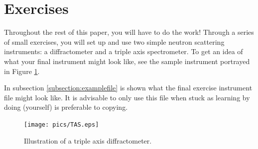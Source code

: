 \section{Exercises}
Throughout the rest of this paper, you will have to do the work!
Through a series of small exercises, you will set up and use two simple
neutron scattering instruments: a diffractometer and a triple axis spectrometer. To get an idea of what your final
instrument might look like, see the sample instrument portrayed in Figure \ref{instr.eps}.

In subsection \ref{subsection:examplefile} is shown what the final exercise instrument file might look like. It is advisable to only use this file when stuck as learning by doing (yourself) is preferable to copying.
\begin{figure}[htb!]
\begin{center}
\texttt{[image: pics/TAS.eps]}
\end{center}
\caption{Illustration of a triple axis diffractometer.}
\label{instr.eps}
\end{figure}
